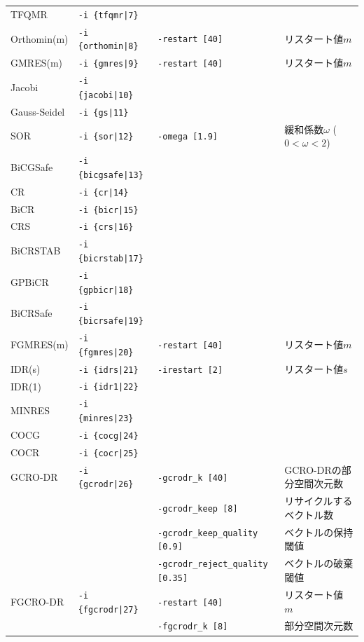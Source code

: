 \documentclass[a4paper]{jarticle}
\begin{document}
{{\begin{minipage}[t]{\textwidth}
\begin{center}
\begin{tabular}{l|lll}
 TFQMR       & \verb=-i {tfqmr|7}=      &    \\
 Orthomin(m) & \verb=-i {orthomin|8}=   & \verb=-restart [40]= & リスタート値$m$  \\
 GMRES(m)    & \verb=-i {gmres|9}=      & \verb=-restart [40]= & リスタート値$m$  \\ 
 Jacobi      & \verb=-i {jacobi|10}=    &    \\
 Gauss-Seidel& \verb=-i {gs|11}=        &    \\
 SOR         & \verb=-i {sor|12}=       & \verb=-omega [1.9]=  & 緩和係数$\omega$ ($0<\omega<2$) \\
 BiCGSafe    & \verb=-i {bicgsafe|13}=  &    \\
 CR          & \verb=-i {cr|14}=        &    \\ 
 BiCR        & \verb=-i {bicr|15}=      &    \\
 CRS         & \verb=-i {crs|16}=       &    \\
 BiCRSTAB    & \verb=-i {bicrstab|17}=  &    \\
 GPBiCR      & \verb=-i {gpbicr|18}=    &    \\
 BiCRSafe    & \verb=-i {bicrsafe|19}=  &    \\
 FGMRES(m)   & \verb=-i {fgmres|20}=    & \verb=-restart [40]= & リスタート値$m$  \\ 
 IDR(s)      & \verb=-i {idrs|21}=      & \verb=-irestart [2]= & リスタート値$s$  \\
 IDR(1)      & \verb=-i {idr1|22}=      &    \\ 
 MINRES      & \verb=-i {minres|23}=    &    \\
 COCG        & \verb=-i {cocg|24}=      &    \\
 COCR        & \verb=-i {cocr|25}=      &    \\   
 GCRO-DR     & \verb=-i {gcrodr|26}=    & \verb=-gcrodr_k [40]= & GCRO-DRの部分空間次元数 \\ 
             &                          & \verb=-gcrodr_keep [8]= & リサイクルするベクトル数 \\ 
 &                          & \verb=-gcrodr_keep_quality [0.9]= & ベクトルの保持閾値 \\
 &                          & \verb=-gcrodr_reject_quality [0.35]= & ベクトルの破棄閾値 \\   
 FGCRO-DR    & \verb=-i {fgcrodr|27}=   & \verb=-restart [40]= & リスタート値 $m$ \\
             &                          & \verb=-fgcrodr_k [8]= & 部分空間次元数 \\

\end{tabular}
\end{center}
\end{minipage}}}
\end{document}
